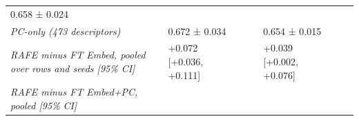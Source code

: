 \documentclass[
  10pt,
]{article}
\begin{document}
\begin{longtable}[]{@{}lllllll@{}}
\begin{minipage}[t]{0.12\columnwidth}
0.658 ± 0.024\strut
\end{minipage}\tabularnewline
\begin{minipage}[t]{0.12\columnwidth}\raggedright
\emph{PC-only (473 descriptors)}\strut
\end{minipage} & \begin{minipage}[t]{0.12\columnwidth}\raggedright
0.672 ± 0.034\strut
\end{minipage} & \begin{minipage}[t]{0.12\columnwidth}\raggedright
\strut
\end{minipage} & \begin{minipage}[t]{0.12\columnwidth}\raggedright
\strut
\end{minipage} & \begin{minipage}[t]{0.12\columnwidth}\raggedright
0.654 ± 0.015\strut
\end{minipage} & \begin{minipage}[t]{0.12\columnwidth}\raggedright
\strut
\end{minipage} & \begin{minipage}[t]{0.12\columnwidth}\raggedright
\strut
\end{minipage}\tabularnewline
\begin{minipage}[t]{0.12\columnwidth}\raggedright
\emph{RAFE minus FT Embed, pooled over rows and seeds {[}95\%
CI{]}}\strut
\end{minipage} & \begin{minipage}[t]{0.12\columnwidth}\raggedright
+0.072 {[}+0.036, +0.111{]}\strut
\end{minipage} & \begin{minipage}[t]{0.12\columnwidth}\raggedright
\strut
\end{minipage} & \begin{minipage}[t]{0.12\columnwidth}\raggedright
\strut
\end{minipage} & \begin{minipage}[t]{0.12\columnwidth}\raggedright
+0.039 {[}+0.002, +0.076{]}\strut
\end{minipage} & \begin{minipage}[t]{0.12\columnwidth}\raggedright
\strut
\end{minipage} & \begin{minipage}[t]{0.12\columnwidth}\raggedright
\strut
\end{minipage}\tabularnewline
\begin{minipage}[t]{0.12\columnwidth}\raggedright
\emph{RAFE minus FT Embed+PC, pooled {[}95\% CI{]}}\strut

\end{minipage}
\end{longtable}
\end{document}
